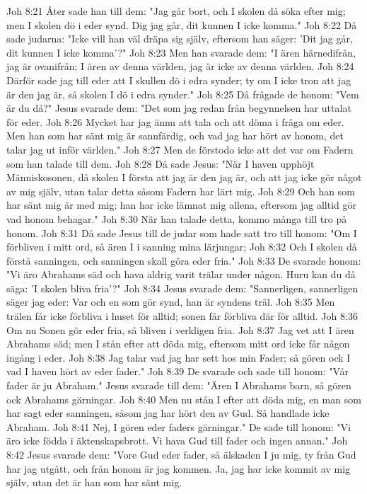 Joh 8:21  Åter sade han till dem: "Jag går bort, och I skolen då söka efter mig; men I skolen dö i eder synd. Dig jag går, dit kunnen I icke komma."
Joh 8:22  Då sade judarna: "Icke vill han väl dräpa sig själv, eftersom han säger: 'Dit jag går, dit kunnen I icke komma'?"
Joh 8:23  Men han svarade dem: "I ären härnedifrån, jag är ovanifrån; I ären av denna världen, jag är icke av denna världen.
Joh 8:24  Därför sade jag till eder att I skullen dö i edra synder; ty om I icke tron att jag är den jag är, så skolen I dö i edra synder."
Joh 8:25  Då frågade de honom: "Vem är du då?" Jesus svarade dem: "Det som jag redan från begynnelsen har uttalat för eder.
Joh 8:26  Mycket har jag ännu att tala och att döma i fråga om eder. Men han som har sänt mig är sannfärdig, och vad jag har hört av honom, det talar jag ut inför världen."
Joh 8:27  Men de förstodo icke att det var om Fadern som han talade till dem.
Joh 8:28  Då sade Jesus: "När I haven upphöjt Människosonen, då skolen I första att jag är den jag är, och att jag icke gör något av mig själv, utan talar detta såsom Fadern har lärt mig.
Joh 8:29  Och han som har sänt mig är med mig; han har icke lämnat mig allena, eftersom jag alltid gör vad honom behagar."
Joh 8:30  När han talade detta, kommo många till tro på honom.
Joh 8:31  Då sade Jesus till de judar som hade satt tro till honom: "Om I förbliven i mitt ord, så ären I i sanning mina lärjungar;
Joh 8:32  Och I skolen då förstå sanningen, och sanningen skall göra eder fria."
Joh 8:33  De svarade honom: "Vi äro Abrahams säd och hava aldrig varit trälar under någon. Huru kan du då säga: 'I skolen bliva fria'?"
Joh 8:34  Jesus svarade dem: "Sannerligen, sannerligen säger jag eder: Var och en som gör synd, han är syndens träl.
Joh 8:35  Men trälen får icke förbliva i huset för alltid; sonen får förbliva där för alltid.
Joh 8:36  Om nu Sonen gör eder fria, så bliven i verkligen fria.
Joh 8:37  Jag vet att I ären Abrahams säd; men I stån efter att döda mig, eftersom mitt ord icke får någon ingång i eder.
Joh 8:38  Jag talar vad jag har sett hos min Fader; så gören ock I vad I haven hört av eder fader."
Joh 8:39  De svarade och sade till honom: "Vår fader är ju Abraham." Jesus svarade till dem: "Ären I Abrahams barn, så gören ock Abrahams gärningar.
Joh 8:40  Men nu stån I efter att döda mig, en man som har sagt eder sanningen, såsom jag har hört den av Gud. Så handlade icke Abraham.
Joh 8:41  Nej, I gören eder faders gärningar." De sade till honom: "Vi äro icke födda i äktenskapsbrott. Vi hava Gud till fader och ingen annan."
Joh 8:42  Jesus svarade dem: "Vore Gud eder fader, så älskaden I ju mig, ty från Gud har jag utgått, och från honom är jag kommen. Ja, jag har icke kommit av mig själv, utan det är han som har sänt mig.
